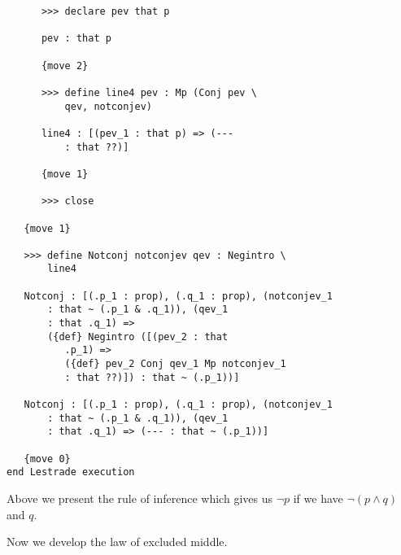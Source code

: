 \documentclass[12pt]{article}
\begin{document}
\begin{verbatim}
      >>> declare pev that p

      pev : that p

      {move 2}

      >>> define line4 pev : Mp (Conj pev \
          qev, notconjev)

      line4 : [(pev_1 : that p) => (--- 
          : that ??)]

      {move 1}

      >>> close

   {move 1}

   >>> define Notconj notconjev qev : Negintro \
       line4

   Notconj : [(.p_1 : prop), (.q_1 : prop), (notconjev_1 
       : that ~ (.p_1 & .q_1)), (qev_1 
       : that .q_1) => 
       ({def} Negintro ([(pev_2 : that 
          .p_1) => 
          ({def} pev_2 Conj qev_1 Mp notconjev_1 
          : that ??)]) : that ~ (.p_1))]

   Notconj : [(.p_1 : prop), (.q_1 : prop), (notconjev_1 
       : that ~ (.p_1 & .q_1)), (qev_1 
       : that .q_1) => (--- : that ~ (.p_1))]

   {move 0}
end Lestrade execution
\end{verbatim}

Above we present the rule of inference which gives us $\neg p$ if we have $\neg(p \wedge q)$ and $q$.

Now we develop the law of excluded middle.
\end{document}

